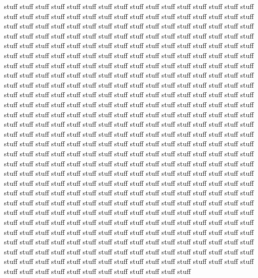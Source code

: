 \documentclass[
  dissertation]{bsu-cs}
\begin{document}
stuff stuff stuff stuff stuff stuff stuff stuff stuff stuff stuff stuff
stuff stuff stuff stuff stuff stuff stuff stuff stuff stuff stuff stuff
stuff stuff stuff stuff stuff stuff stuff stuff stuff stuff stuff stuff
stuff stuff stuff stuff stuff stuff stuff stuff stuff stuff stuff stuff
stuff stuff stuff stuff stuff stuff stuff stuff stuff stuff stuff stuff
stuff stuff stuff stuff stuff stuff stuff stuff stuff stuff stuff stuff
stuff stuff stuff stuff stuff stuff stuff stuff stuff stuff stuff stuff
stuff stuff stuff stuff stuff stuff stuff stuff stuff stuff stuff stuff
stuff stuff stuff stuff stuff stuff stuff stuff stuff stuff stuff stuff
stuff stuff stuff stuff stuff stuff stuff stuff stuff stuff stuff stuff
stuff stuff stuff stuff stuff stuff stuff stuff stuff stuff stuff stuff
stuff stuff stuff stuff stuff stuff stuff stuff stuff stuff stuff stuff
stuff stuff stuff stuff stuff stuff stuff stuff stuff stuff stuff stuff
stuff stuff stuff stuff stuff stuff stuff stuff stuff stuff stuff stuff
stuff stuff stuff stuff stuff stuff stuff stuff stuff stuff stuff stuff
stuff stuff stuff stuff stuff stuff stuff stuff stuff stuff stuff stuff
stuff stuff stuff stuff stuff stuff stuff stuff stuff stuff stuff stuff
stuff stuff stuff stuff stuff stuff stuff stuff stuff stuff stuff stuff
stuff stuff stuff stuff stuff stuff stuff stuff stuff stuff stuff stuff
stuff stuff stuff stuff stuff stuff stuff stuff stuff stuff stuff stuff
stuff stuff stuff stuff stuff stuff stuff stuff stuff stuff stuff stuff
stuff stuff stuff stuff stuff stuff stuff stuff stuff stuff stuff stuff
stuff stuff stuff stuff stuff stuff stuff stuff stuff stuff stuff stuff
stuff stuff stuff stuff stuff stuff stuff stuff stuff stuff stuff stuff
stuff stuff stuff stuff stuff stuff stuff stuff stuff stuff stuff stuff
stuff stuff stuff stuff stuff stuff stuff stuff stuff stuff stuff stuff
stuff stuff stuff stuff stuff stuff stuff stuff stuff stuff stuff stuff
stuff stuff stuff stuff stuff stuff stuff stuff stuff stuff stuff stuff
stuff stuff stuff stuff stuff stuff stuff stuff stuff stuff stuff stuff
stuff stuff stuff stuff stuff stuff stuff stuff stuff stuff stuff stuff
stuff stuff stuff stuff stuff stuff stuff stuff stuff stuff stuff stuff
stuff stuff stuff stuff stuff stuff stuff stuff stuff stuff stuff stuff
stuff stuff stuff stuff stuff stuff stuff stuff stuff stuff stuff stuff
stuff stuff stuff stuff stuff stuff stuff stuff stuff stuff stuff stuff
stuff stuff stuff stuff stuff stuff stuff stuff stuff stuff stuff stuff
stuff stuff stuff stuff stuff stuff stuff stuff stuff stuff stuff stuff
stuff stuff stuff stuff stuff stuff stuff stuff stuff stuff stuff stuff
\end{document}
